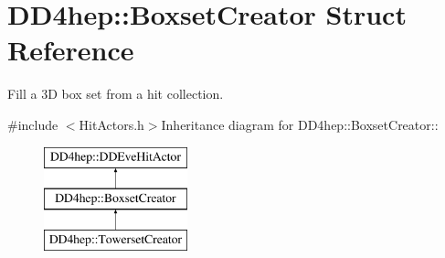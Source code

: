 \hypertarget{struct_d_d4hep_1_1_boxset_creator}{
\section{DD4hep::BoxsetCreator Struct Reference}
\label{struct_d_d4hep_1_1_boxset_creator}
}


Fill a 3D box set from a hit collection.  


{\ttfamily \#include $<$HitActors.h$>$}Inheritance diagram for DD4hep::BoxsetCreator::\begin{figure}[H]
\begin{center}
\leavevmode
\includegraphics[height=3cm]{struct_d_d4hep_1_1_boxset_creator}
\end{center}
\end{figure}
